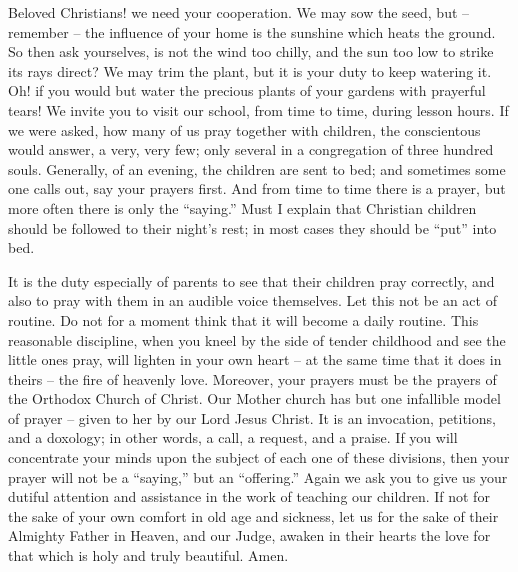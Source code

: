 Beloved Christians! we need your cooperation.
We may sow the seed, but -- remember -- 
the influence of your home is the sunshine 
which heats the ground. So then ask yourselves,
is not the wind too chilly, and the sun 
too low to strike its rays direct? We may trim 
the plant, but it is your duty to keep watering it. 
Oh! if you would but water the precious plants 
of your gardens with prayerful tears! We 
invite you to visit our school, from time to time,
during lesson hours. If we were asked, how 
many of us pray together with children, the 
conscientous would answer, a very, very few; 
only several in a congregation of three hundred 
souls. Generally, of an evening, the children 
are sent to bed; and sometimes some one calls 
out, say your prayers first. And from time to 
time there is a prayer, but more often there is 
only the ``saying.'' Must I explain that Christian 
children should be followed to their night's 
rest; in most cases they should be ``put'' into 
bed. 

It is the duty especially of parents to see that 
their children pray correctly, and also to pray 
with them in an audible voice themselves. Let 
this not be an act of routine. Do not for a 
moment think that it will become a daily 
routine. This reasonable discipline, when 
you kneel by the side of tender childhood 
and see the little ones pray, will lighten 
in your own heart -- at the same time 
that it does in theirs -- the fire of heavenly love. 
Moreover, your prayers must be the prayers of 
the Orthodox Church of Christ. Our Mother 
church has but one infallible model of prayer -- 
given to her by our Lord Jesus Christ. It is an 
invocation, petitions, and a doxology; in other
words, a call, a request, and a praise. If you 
will concentrate your minds upon the subject 
of each one of these divisions, then your prayer 
will not be a ``saying,'' but an ``offering.'' 
Again we ask you to give us your dutiful attention
and assistance in the work of teaching our 
children. If not for the sake of your own comfort
in old age and sickness, let us for the sake 
of their Almighty Father in Heaven, and our 
Judge, awaken in their hearts the love for that 
which is holy and truly beautiful. Amen.
